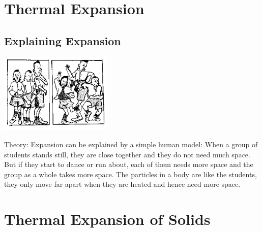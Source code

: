 \section{Thermal Expansion} 

\begin{multicols}{2}


\subsection{Explaining Expansion}

\begin{center}
\includegraphics[width=0.4\textwidth]{./img/source/explaining-expansion-2.png}
\end{center}

\begin{description*}
\item[Theory:]{Expansion can be explained by a simple human model: When a group of students stands still, they are close together and they do not need much space. But if they start to dance or run about, each of them needs more space and the group as a whole takes more space. The particles in a body are like the students, they only move far apart when they are heated and hence need more space.}
\end{description*}


\section*{Thermal Expansion of Solids} 



\end{multicols}
